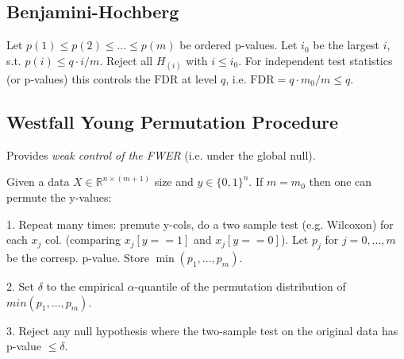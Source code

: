 \subsection*{Benjamini-Hochberg}
Let $p(1)\leq p(2) \leq ... \leq p(m)$ be ordered p-values. Let $i_0$ be the largest $i$, s.t. $p(i)\leq q\cdot i / m$. 
Reject all $H_{(i)}$ with $i\leq i_0$. For independent test statistics (or p-values) this controls the $\text{FDR}$ at level $q$, i.e. $\text{FDR}=q\cdot m_0 / m \leq q$. 

\subsection*{Westfall Young Permutation Procedure}
Provides \textit{weak control of the FWER} (i.e. under the global null). 

Given a data $X \in \mathbb{R}^{n\times (m+1)}$ size and $y\in \{0,1\}^n$. 
If $m=m_0$ then one can permute the y-values:

1. Repeat many times: premute y-cols, do a two sample test (e.g. Wilcoxon) for each $x_j$ col. (comparing $x_j[y==1]$ and $x_j[y==0]$). Let $p_j$ for $j=0,...,m$ be the corresp. p-value. Store $\min(p_1,...,p_m)$.

2. Set $\delta$ to the empirical $\alpha$-quantile of the permutation distribution of $min(p_1,...,p_m)$. 

3. Reject any null hypothesis where the two-sample test on the original data has p-value $\leq \delta$.


